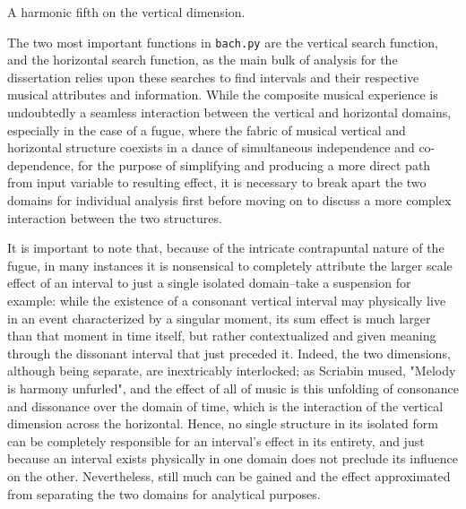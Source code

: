 \begin{Example}[H]
    \begin{center}
    \caption{ A harmonic fifth on the vertical dimension. }
    \end{center}
\end{Example}
    
    The two most important functions in \texttt{bach.py} are the vertical
search function, and the horizontal search function, as the main bulk of
analysis for the dissertation relies upon these searches to find
intervals and their respective musical attributes and information. While
the composite musical experience is undoubtedly a seamless interaction
between the vertical and horizontal domains, especially in the case of a
fugue, where the fabric of musical vertical and horizontal structure
coexists in a dance of simultaneous independence and co-dependence, for
the purpose of simplifying and producing a more direct path from input
variable to resulting effect, it is necessary to break apart the two
domains for individual analysis first before moving on to discuss a more
complex interaction between the two structures.

It is important to note that, because of the intricate contrapuntal
nature of the fugue, in many instances it is nonsensical to completely
attribute the larger scale effect of an interval to just a single
isolated domain--take a suspension for example: while the existence of
a consonant vertical interval may physically live in an event
characterized by a singular moment, its sum effect is much larger than
that moment in time itself, but rather contextualized and given meaning
through the dissonant interval that just preceded it. Indeed, the two
dimensions, although being separate, are inextricably interlocked; as
Scriabin mused, "Melody is harmony unfurled", and the effect of all of
music is this unfolding of consonance and dissonance over the domain of
time, which is the interaction of the vertical dimension across the
horizontal. Hence, no single structure in its isolated form can be
completely responsible for an interval's effect in its entirety, and
just because an interval exists physically in one domain does not
preclude its influence on the other. Nevertheless, still much can be
gained and the effect approximated from separating the two domains for
analytical purposes.

